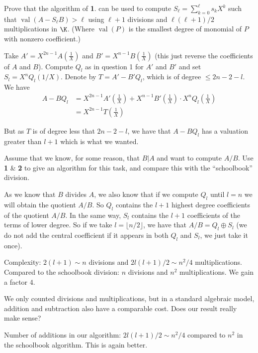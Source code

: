 \documentclass[11pt]{exam}
\theoremstyle{definition}
\newcommand{\val}{\operatorname{val}}
\begin{document}
{\begin{questions}
\question Prove that the algorithm of {\textbf 1.} can be used to compute
$S_\ell = \sum_{k=0}^\ell s_k X^k$ such that $\val(A - S_{\ell}B) > \ell$ using $\ell+1$
divisions and $\ell(\ell + 1)/2$ multiplications in $\K$. (Where $\val(P)$ is the smallest degree of monomial of $P$ with nonzero coefficient.)

\begin{solution}
Take $A' = X^{2n-1} A(\frac{1}{X})$ and $B' = X^{n-1} B(\frac{1}{X})$ (this just reverse the coefficients of $A$ and $B$). Compute $Q_l$ as in question 1 for $A'$ and $B'$ and set $S_l = X^{n} Q_l(1/X)$. Denote by $T = A' - B' Q_l$, which is of degree $\leq 2n-2-l$. We have
\begin{align*}
A - B Q_l &= X^{2n-1} A'(\frac{1}{X}) + X^{n-1} B'(\frac{1}{X}) \cdot X^{n} Q_l(\frac{1}{X}) \\
&= X^{2n-1} T(\frac{1}{X})
\end{align*}

But as $T$ is of degree less that $2n-2-l$, we have that $A-BQ_l$ has a valuation greater than $l+1$ which is what we wanted.
\end{solution}

\question Assume that we know, for some reason, that $B | A$ and
want to compute $A/B$. Use {\textbf 1} \& {\textbf 2} to give an
algorithm for this task, and compare this with the ``schoolbook''
division.

\begin{solution}
As we know that $B$ divides $A$, we also know that if we compute $Q_l$ until $l = n$ we will obtain the quotient $A/B$. So $Q_l$ contains the $l+1$ highest degree coefficients of the quotient $A/B$. In the same way, $S_l$ contains the $l+1$ coefficients of the terms of lower degree. So if we take $l = \lfloor n/2 \rfloor$, we have that $A/B = Q_l \oplus S_l$ (we do not add the central coefficient if it appears in both $Q_l$ and $S_l$, we just take it once).

Complexity: $2(l+1) \sim n$ divisions and $2l(l+1)/2 \sim n^2/4$ multiplications. Compared to the schoolbook division: $n$ divisions and $n^2$ multiplications. We gain a factor 4.
\end{solution}


\question We only counted divisions and multiplications, but in a
standard algebraic model, addition and subtraction also have a
comparable cost. Does our result really make sense?

\begin{solution}
Number of additions in our algorithm: $2l(l+1)/2 \sim n^2/4$ compared to $n^2$ in the schoolbook algorithm. This is again better.
\end{solution}


\end{questions}}
\end{document}
